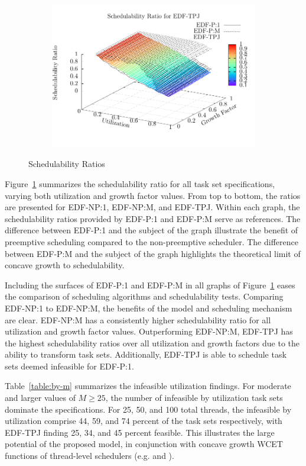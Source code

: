\begin{figure}
\begin{subfigure}[t]{\linewidth}
    \includegraphics[width=\linewidth]{plot/avg-alg-sched/avg-ratio-TPJ-i}
  \end{subfigure}
  \caption{Schedulability Ratios}
  \label{fig:eval-summary}
\end{figure}

Figure~\ref{fig:eval-summary} summarizes the schedulability ratio
for all task set specifications, varying both
utilization and growth factor values. From top to bottom, the ratios
are presented for EDF-NP:1, EDF-NP:M, and EDF-TPJ. Within each graph, the
schedulability ratios provided by EDF-P:1 and EDF-P:M serve as
references. The difference between EDF-P:1 and the subject of the
graph illustrate the benefit of preemptive scheduling compared to the
non-preemptive scheduler. The difference between EDF-P:M and the
subject of the graph highlights the theoretical limit of concave
growth to schedulability. 

Including the surfaces of EDF-P:1 and EDF-P:M in all graphs of
Figure~\ref{fig:eval-summary} eases the comparison of scheduling
algorithms and schedulability tests. Comparing EDF-NP:1 
to EDF-NP:M, the benefits of the model and scheduling mechanism are
clear. EDF-NP:M has a consistently higher schedulability ratio for all
utilization and growth factor values. Outperforming
EDF-NP:M, EDF-TPJ has the highest schedulability ratios
over all utilization and growth factors due to the ability to
transform task sets. Additionally, EDF-TPJ is able to schedule task
sets deemed infeasible for EDF-P:1.

Table~\ref{table:by-m} summarizes the infeasible utilization
findings. For moderate and larger values of ${M \ge 25}$, the number
of infeasible by utilization task sets dominate the
specifications. For 25, 50, and 100 total threads, the infeasible by
utilization comprise 44, 59, and 74 percent of the task sets
respectively, with EDF-TPJ finding 25, 34, and 45 percent
feasible. This illustrates the large potential of the proposed model,
in conjunction with concave growth WCET functions of
thread-level schedulers (e.g. \bundle{} and \bundlep{}).

